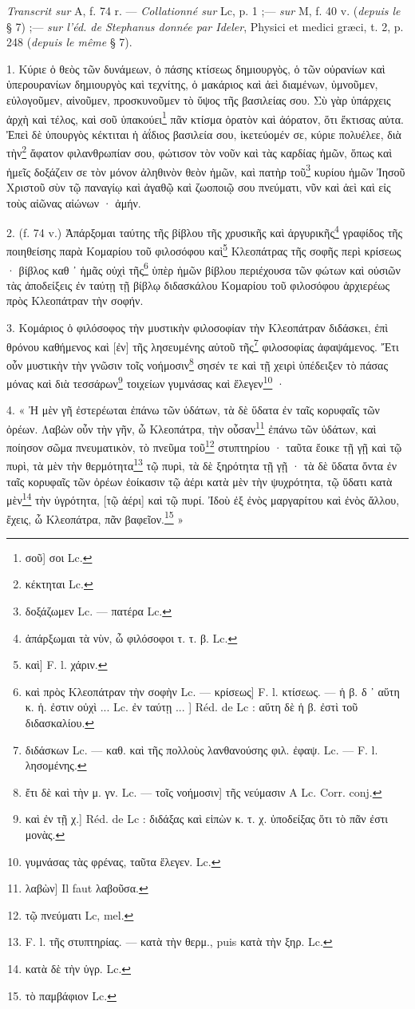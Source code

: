 \documentclass[a4paper, 11pt, oneside, polutonikogreek, french]{article}
\begin{document}
\emph{Transcrit sur} A, f. 74 r. --- \emph{Collationné sur} Lc, p. 1 ;--- \emph{sur} M, f. 40 v. (\emph{depuis le} § 7) ;--- \emph{sur l'éd. de Stephanus donnée par Ideler}, Physici et medici græci, t. 2, p. 248 (\emph{depuis le même} § 7).

\bigskip

1. Κύριε ὁ θεὸς τῶν δυνάμεων, ὁ πάσης κτίσεως δημιουργὸς, ὁ τῶν οὐρανίων καὶ ὑπερουρανίων δημιουργὸς καὶ τεχνίτης, ὁ μακάριος καὶ ἀεὶ διαμένων, ὑμνοῦμεν, εὐλογοῦμεν, αἰνοῦμεν, προσκυνοῦμεν τὸ ὕψος τῆς βασιλείας σου. Σὺ γὰρ ὑπάρχεις ἀρχὴ καὶ τέλος, καὶ σοῦ ὑπακούει\footnote{σοῦ] σοι Lc.} πᾶν κτίσμα ὁρατὸν καὶ ἀόρατον, ὅτι ἔκτισας αὐτα. Ἐπεὶ δὲ ὑπουργὸς κέκτιται ἡ ἀΐδιος βασιλεία σου, ἰκετεύομέν σε, κύριε πολυέλεε, διὰ τὴν\footnote{κέκτηται Lc.} ἄφατον φιλανθρωπίαν σου, φώτισον τὸν νοῦν καὶ τὰς καρδίας ἡμῶν, ὅπως καὶ ἡμεῖς δοξάζειν σε τὸν μόνον ἀληθινὸν θεὸν ἡμῶν, καὶ πατὴρ τοῦ\footnote{δοξάζωμεν Lc. --- πατέρα Lc.} κυρίου ἡμῶν Ἰησοῦ Χριστοῦ σὺν τῷ παναγίῳ καὶ ἀγαθῷ καὶ ζωοποιῷ σου πνεύματι, νῦν καὶ ἀεὶ καὶ εἰς τοὺς αἰῶνας αἰώνων · ἀμήν.

2. (f. 74 v.) Ἀπάρξομαι ταύτης τῆς βίβλου τῆς χρυσικῆς καὶ ἀργυρικῆς\footnote{ἀπάρξωμαι τὰ νὺν, ὦ φιλόσοφοι τ. τ. β. Lc.} γραφίδος τῆς ποιηθείσης παρὰ Κομαρίου τοῦ φιλοσόφου καὶ\footnote{καὶ] F. l. χάριν.} Κλεοπάτρας τῆς σοφῆς περὶ κρίσεως · βίβλος καθ ᾽ ἡμᾶς οὐχὶ τῆς\footnote{καὶ πρὸς Κλεοπάτραν τὴν σοφὴν Lc. --- κρίσεως] F. l. κτίσεως. --- ἡ β. δ ᾽ αὕτη κ. ἡ. ἐστιν οὐχὶ ... Lc. ἐν ταύτῃ ... ] Réd. de Lc : αὕτη δὲ ἡ β. ἐστὶ τοῦ διδασκαλίου.} ὑπὲρ ἡμῶν βίβλου περιέχουσα τῶν φώτων καὶ οὐσιῶν τὰς ἀποδείξεις ἐν ταύτῃ τῇ βίβλῳ διδασκάλου Κομαρίου τοῦ φιλοσόφου ἀρχιερέως πρὸς Κλεοπάτραν τὴν σοφήν.

3. Κομάριος ὁ φιλόσοφος τὴν μυστικὴν φιλοσοφίαν τὴν Κλεοπάτραν διδάσκει, ἐπὶ θρόνου καθήμενος καὶ [ἐν] τῆς λησευμένης αὐτοῦ τῆς\footnote{διδάσκων Lc. --- καθ. καὶ τῆς πολλοὺς λανθανούσης φιλ. ἐφαψ. Lc. --- F. l. λησομένης.} φιλοσοφίας ἀφαψάμενος. Ἔτι οὖν μυστικὴν τὴν γνῶσιν τοῖς νοήμοσιν\footnote{ἔτι δὲ καὶ τὴν μ. γν. Lc. --- τοῖς νοήμοσιν] τῆς νεύμασιν A Lc. Corr. conj.} σησέν τε καὶ τῇ χειρὶ ὑπέδειξεν τὸ πάσας μόνας καὶ διὰ τεσσάρων\footnote{καὶ ἐν τῇ χ.] Réd. de Lc : διδάξας καὶ εἰπὼν κ. τ. χ. ὑποδείξας ὅτι τὸ πᾶν ἐστι μονὰς.} τοιχείων γυμνάσας καὶ ἔλεγεν\footnote{γυμνάσας τὰς φρένας, ταῦτα ἕλεγεν. Lc.} ·

4. « Ἠ μὲν γῆ ἐστερέωται ἐπάνω τῶν ὑδάτων, τὰ δὲ ὕδατα ἐν ταῖς κορυφαῖς τῶν ὀρέων. Λαβὼν οὖν τὴν γῆν, ὦ Κλεοπάτρα, τὴν οὖσαν\footnote{λαβὼν] Il faut λαβοῦσα.} ἐπάνω τῶν ὑδάτων, καὶ ποίησον σῶμα πνευματικὸν, τὸ πνεῦμα τοῦ\footnote{τῷ πνεύματι Lc, mel.} στυπτηρίου · ταῦτα ἔοικε τῇ γῇ καὶ τῷ πυρὶ, τὰ μὲν τὴν θερμότητα\footnote{F. l. τῆς στυπτηρίας. --- κατὰ τὴν θερμ., puis κατὰ τὴν ξηρ. Lc.} τῷ πυρὶ, τὰ δὲ ξηρότητα τῇ γῇ · τὰ δὲ ὕδατα ὄντα ἐν ταῖς κορυφαῖς τῶν ὀρέων ἐοίκασιν τῷ ἀέρι κατὰ μὲν τὴν ψυχρότητα, τῷ ὕδατι κατὰ μὲν\footnote{κατὰ δὲ τὴν ὑγρ. Lc.} τὴν ὐγρότητα, [τῷ ἀέρι] καὶ τῷ πυρί. Ἰδοὺ ἐξ ἐνὸς μαργαρίτου καὶ ἐνὸς ἄλλου, ἔχεις, ὦ Κλεοπάτρα, πᾶν βαφεῖον.\footnote{τὸ παμβάφιον Lc.} »
\end{document}
